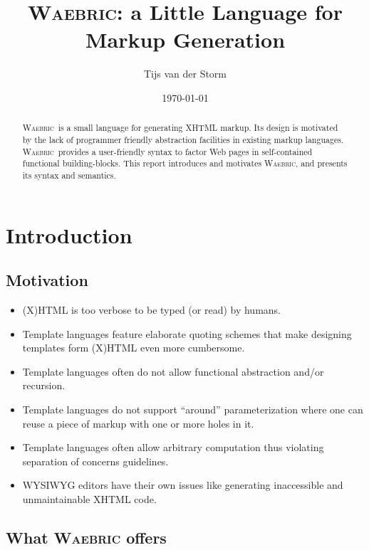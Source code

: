 \documentclass[a4paper]{article}
\def\waebric{\textsc{Waebric}\xspace}
\begin{document}
\title{\waebric: a Little Language for Markup Generation}
\author{Tijs van der Storm}
\date{\today}
\maketitle

\begin{abstract}
  \noindent \waebric\ is a small language for generating XHTML
  markup. Its design is motivated by the lack of programmer friendly
  abstraction facilities in existing markup languages.  \waebric\
  provides a user-friendly syntax to factor Web pages in
  self-contained functional building-blocks. This report introduces
  and motivates \waebric, and presents its syntax and semantics.
\end{abstract}

\section{Introduction}

\subsection{Motivation}

\begin{itemize}
\item (X)HTML is too verbose to be typed (or read) by humans.
\item Template languages feature elaborate quoting schemes that make
  designing templates form (X)HTML even more cumbersome.
\item Template languages often do not allow functional abstraction
  and/or recursion.
\item Template languages do not support ``around'' parameterization
  where one can reuse a piece of markup with one or more holes in it.
\item Template languages often allow arbitrary computation thus
  violating separation of concerns guidelines.
\item WYSIWYG editors have their own issues like generating
  inaccessible and unmaintainable XHTML code.
\end{itemize}



\subsection{What \waebric offers}
\end{document}
